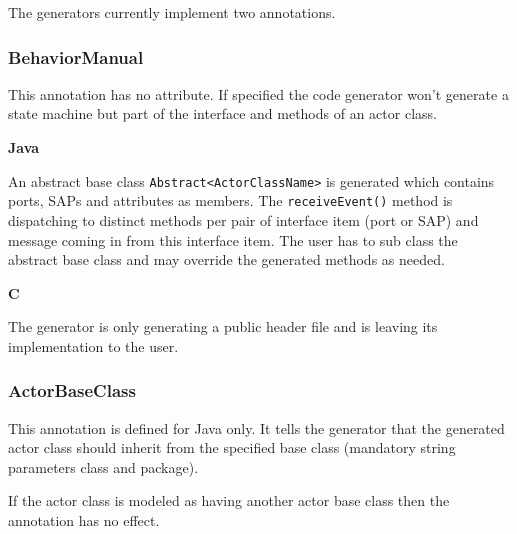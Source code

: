 The \eTrice{} generators currently implement two annotations.

\subsubsection{BehaviorManual}

This annotation has no attribute. If specified the code generator won't generate a state machine but
part of the interface and methods of an actor class.

\textbf{Java}

An abstract base class \texttt{Abstract<ActorClassName>} is generated which contains ports, SAPs and attributes as members.
The \texttt{receiveEvent()} method is dispatching to distinct methods per pair of interface item (port or SAP) and message
coming in from this interface item. The user has to sub class the abstract base class and may override the
generated methods as needed.

\textbf{C}

The generator is only generating a public header file and is leaving its implementation to the user.

\subsubsection{ActorBaseClass}

This annotation is defined for Java only. It tells the generator that the generated actor class should
inherit from the specified base class (mandatory string parameters class and package).

If the actor class is modeled as having another actor base class then the annotation has no effect.
